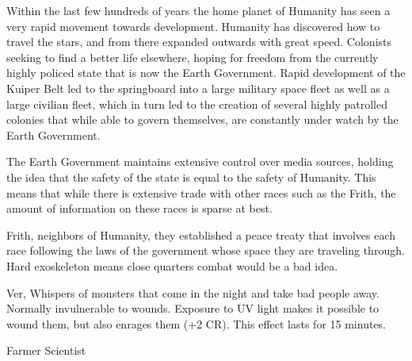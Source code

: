\documentclass[blue]{guildcamp4}
\begin{document}
\name{\bEarth{}}

Within the last few hundreds of years the home planet of Humanity has seen a very rapid movement towards development. Humanity has discovered how to travel the stars, and from there expanded outwards with great speed. Colonists seeking to find a better life elsewhere, hoping for freedom from the currently highly policed state that is now the Earth Government. Rapid development of the Kuiper Belt led to the springboard into a large military space fleet as well as a large civilian fleet, which in turn led to the creation of several highly patrolled colonies that while able to govern themselves, are constantly under watch by the Earth Government.

The Earth Government maintains extensive control over media sources, holding the idea that the safety of the state is equal to the safety of Humanity. This means that while there is extensive trade with other races such as the Frith, the amount of information on these races is sparse at best.

Frith, neighbors of Humanity, they established a peace treaty that involves each race following the laws of the government whose space they are traveling through. Hard exoskeleton means close quarters combat would be a bad idea.

Ver, Whispers of monsters that come in the night and take bad people away. Normally invulnerable to wounds. Exposure to UV light makes it possible to wound them, but also enrages them (+2 CR). This effect lasts for 15 minutes.


\begin{members}
	\member{\cPlead{}} Farmer
	\member{\cSpite{}} Scientist

\end{members}
\end{document}

